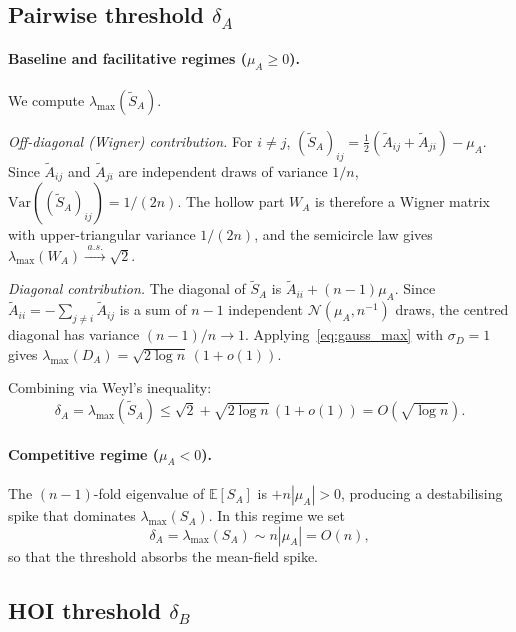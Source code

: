 \documentclass[pdflatex,sn-mathphys-num]{sn-jnl}%
\begin{document}
\begin{appendices}
\subsection*{Pairwise threshold $\delta_A$}

\paragraph{Baseline and facilitative regimes ($\mu_A \geq 0$).} We compute $\lambda_{\max}(\tilde{S}_A)$.

\emph{Off-diagonal (Wigner) contribution.} For $i \neq j$, $(\tilde{S}_A)_{ij} = \tfrac{1}{2}(\tilde{A}_{ij} + \tilde{A}_{ji}) - \mu_A$. Since $\tilde{A}_{ij}$ and $\tilde{A}_{ji}$ are independent draws of variance $1/n$, $\mathrm{Var}((\tilde{S}_A)_{ij}) = 1/(2n)$. The hollow part $W_A$ is therefore a Wigner matrix with upper-triangular variance $1/(2n)$, and the semicircle law gives $\lambda_{\max}(W_A) \xrightarrow{\;a.s.\;} \sqrt{2}$.

\emph{Diagonal contribution.} The diagonal of $\tilde{S}_A$ is $\tilde{A}_{ii} + (n-1)\mu_A$. Since $\tilde{A}_{ii} = -\sum_{j \neq i} \tilde{A}_{ij}$ is a sum of $n-1$ independent $\mathcal{N}(\mu_A, n^{-1})$ draws, the centred diagonal has variance $(n-1)/n \to 1$. Applying~\eqref{eq:gauss_max} with $\sigma_D = 1$ gives $\lambda_{\max}(D_A) = \sqrt{2\log n}\,(1+o(1))$.

Combining via Weyl's inequality:
\begin{equation}\label{eq:rmt_A}
\delta_A = \lambda_{\max}(\tilde{S}_A) \leq \sqrt{2} + \sqrt{2\log n}\,(1+o(1)) = O(\sqrt{\log n}).
\end{equation}

\paragraph{Competitive regime ($\mu_A < 0$).} The $(n{-}1)$-fold eigenvalue of $\mathbb{E}[S_A]$ is $+n|\mu_A| > 0$, producing a destabilising spike that dominates $\lambda_{\max}(S_A)$. In this regime we set
\begin{equation}\label{eq:rmt_A_comp}
\delta_A = \lambda_{\max}(S_A) \sim n|\mu_A| = O(n),
\end{equation}
so that the threshold absorbs the mean-field spike.

\subsection*{HOI threshold $\delta_B$}


\end{appendices}
\end{document}

